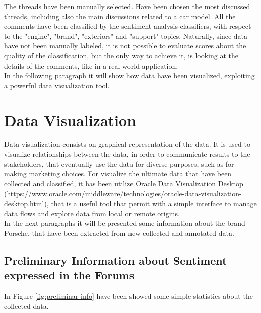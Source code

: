The threads have been manually selected. Have been chosen the most discussed threads, including also the main discussions related to a car model. All the comments have been classified by the sentiment analysis classifiers, with respect to the "engine", "brand", "exteriors" and "support" topics. Naturally, since data have not been manually labeled, it is not possible to evaluate scores about the quality of the classification, but the only way to achieve it, is looking at the details of the comments, like in a real world application.\\
In the following paragraph it will show how data have been visualized, exploiting a powerful data visualization tool.


\section{Data Visualization}

Data visualization consists on graphical representation of the data. It is used to visualize relationships between the data, in order to communicate results to the stakeholders, that eventually use the data for diverse purposes, such as for making marketing choices. For visualize the ultimate data that have been collected and classified, it has been utilize Oracle Data Visualization Desktop (\url{https://www.oracle.com/middleware/technologies/oracle-data-visualization-desktop.html}), that is a useful tool that permit with a simple interface to manage data flows and explore data from local or remote origins.\\
In the next paragraphs it will be presented some information about the brand Porsche, that have been extracted from new collected and annotated data.


\subsection{Preliminary Information about Sentiment expressed in the Forums}

In Figure \ref{fig:preliminar-info} have been showed some simple statistics about the collected data.

